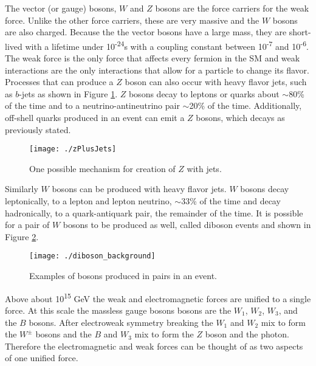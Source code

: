 	The vector (or gauge) bosons, $W$ and $Z$ bosons are the force carriers for the weak force.  Unlike the other force carriers, these are very massive and the $W$ bosons are also charged.  Because the the vector bosons have a large mass, they are short-lived with a lifetime under 10\textsuperscript{-24}s with a coupling constant between 10\textsuperscript{-7} and 10\textsuperscript{-6}.  The weak force is the only force that affects every fermion in the SM and weak interactions are the only interactions that allow for a particle to change its flavor.  \\ %
	
	Processes that can produce a $Z$ boson can also occur with heavy flavor jets, such as $b$-jets as shown in Figure \ref{fig:zplusjets}.  $Z$ bosons decay to leptons or quarks about $\sim$80\% of the time and to a neutrino-antineutrino pair $\sim$20\% of the time.  Additionally, off-shell quarks produced in an event can emit a $Z$ bosons, which decays as previously stated.  \\
	
\begin{figure}[h!]
  \centering
	\texttt{[image: ./zPlusJets]}
\caption{\label{fig:zplusjets}{ One possible mechanism for creation of $Z$ with jets. }} 
\end{figure}	
	
	Similarly $W$ bosons can be produced with heavy flavor jets.  $W$ bosons decay leptonically, to a lepton and lepton neutrino, $\sim$33\% of the time and decay hadronically, to a quark-antiquark pair, the remainder of the time.  It is possible for a pair of $W$ bosons to be produced as well, called diboson events and shown in Figure \ref{fig:diboson}. \\
	
\begin{figure}[h!]
  \centering
	\texttt{[image: ./diboson\_background]}
\caption{\label{fig:diboson}{ Examples of bosons produced in pairs in an event. }} 
\end{figure}	
	
	
	Above about 10\textsuperscript{15} GeV the weak and electromagnetic forces are unified to a single force.  At this scale the massless gauge bosons bosons are the $W_{1}$, $W_{2}$, $W_{3}$, and the $B$ bosons.  After electroweak symmetry breaking the $W_{1}$ and $W_{2}$ mix to form the $W^{\pm}$ bosons and the $B$ and $W_{3}$ mix to form the $Z$ boson and the photon.  Therefore the electromagnetic and weak forces can be thought of as two aspects of one unified force.  \\

